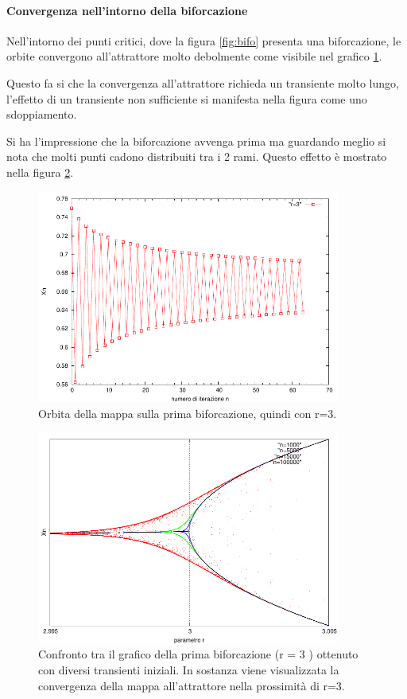 \documentclass[13pt]{article}
\begin{document}
\clearpage
\paragraph{Convergenza nell'intorno della biforcazione}

Nell'intorno dei punti critici, dove la figura \ref{fig:bifo} presenta una biforcazione, le orbite convergono all'attrattore molto debolmente come visibile nel grafico \ref{fig:quadrobif}.

Questo fa si che la convergenza all'attrattore richieda un transiente molto lungo, l'effetto di un transiente non sufficiente si manifesta nella figura come uno sdoppiamento.

Si ha l'impressione che la biforcazione avvenga prima ma guardando meglio si nota che molti punti cadono distribuiti tra i 2 rami. Questo effetto è mostrato nella figura \ref{fig:confrontn}.
\begin{figure}[!h]
\centering
\includegraphics[width=10cm,keepaspectratio]{picture/mappa3/r=3}
\caption{Orbita della mappa sulla prima biforcazione, quindi con r=3.}
\label{fig:quadrobif}
\end{figure}
%
\begin{figure}[!h]
\centering
\includegraphics[width=10cm,keepaspectratio]{picture/mappa5/confronto_n}
\caption{Confronto tra il grafico della prima biforcazione (r = 3 ) ottenuto con diversi transienti iniziali. In sostanza viene visualizzata la convergenza della mappa all'attrattore nella prossimità di r=3.}
\label{fig:confrontn}
\end{figure}
\end{document}
